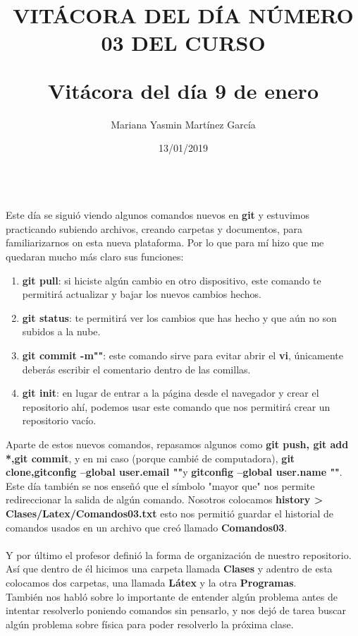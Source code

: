 \documentclass[letterpaper, 12pt, twoside]{article}
\title{\Huge\item\color{red}\textbf {VITÁCORA DEL DÍA NÚMERO 03 DEL CURSO}}
\author{Mariana Yasmin Martínez García}
\date{13/01/2019}
\begin{document}
	\maketitle
	
	\newpage
	\title{\huge\textbf{Vitácora del día 9 de enero\\}} \\
	Este día se siguió viendo algunos comandos nuevos en \textbf{git} y estuvimos practicando subiendo archivos, creando carpetas y documentos, para familiarizarnos on esta nueva plataforma. Por lo que para mí hizo que me quedaran mucho más claro sus funciones:
	\begin{enumerate}
		\item\textbf{\large git pull}: si hiciste algún cambio en otro dispositivo, este comando te permitirá actualizar y bajar los nuevos cambios hechos.
		\item\textbf{\large git status}: te permitirá ver los cambios que has hecho y que aún no son subidos a la nube.
		\item\textbf{\large git commit -m""}: este comando sirve para evitar abrir el \textbf{vi}, únicamente deberás escribir el comentario dentro de las comillas.
		\item\textbf{\large git init}: en lugar de entrar a la página desde el navegador y crear el repositorio ahí, podemos usar este comando que nos permitirá crear un repositorio vacío.
	\end{enumerate}
    Aparte de estos nuevos comandos, repasamos algunos como \textbf{git push, git add *,git commit}, y en mi caso (porque cambié de computadora), \textbf{git clone,gitconfig --global user.email ""}y \textbf{gitconfig --global user.name ""}. \newline
	Este día también se nos enseñó que el símbolo "mayor que" nos permite redireccionar la salida de algún comando. Nosotros colocamos \textbf{history > Clases/Latex/Comandos03.txt} esto nos permitió guardar el historial de comandos usados en un archivo que creó llamado \textbf{Comandos03}. \\ \\
	Y por último el profesor definió la forma de organización de nuestro repositorio. Así que dentro de él hicimos una carpeta llamada \textbf{Clases} y adentro de esta colocamos dos carpetas, una llamada \textbf{Látex} y la otra \textbf{Programas}. \\
	También nos habló sobre lo importante de entender algún problema antes de intentar resolverlo poniendo comandos sin pensarlo, y nos dejó de tarea buscar algún problema sobre física para poder resolverlo la próxima clase.
	
\end{document}
